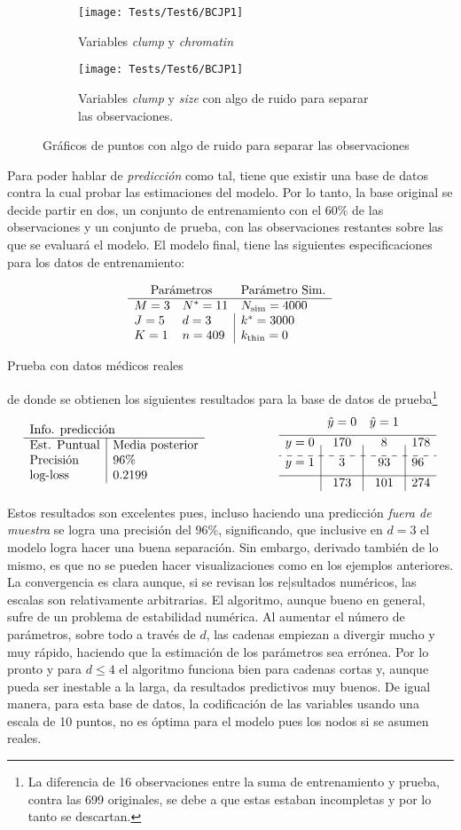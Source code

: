 \documentclass[../Main/Main.tex]{subfiles}
\begin{document}
\begin{figure}[h]
        \centering
        \begin{subfigure}[b]{0.45\textwidth}
            \centering
            \texttt{[image: Tests/Test6/BCJP1]}
            \caption{Variables \textit{clump} y \textit{chromatin}}
			\label{fig:BCJP1}
        \end{subfigure}
        \hfill
        \begin{subfigure}[b]{0.45\textwidth}  
            \centering 
            \texttt{[image: Tests/Test6/BCJP1]}
            \caption{Variables \textit{clump} y \textit{size} con algo de ruido para separar las observaciones.}
			\label{fig:BCJP2}
        \end{subfigure}
		\caption{Gráficos de puntos con algo de ruido para separar las observaciones}
		\label{fig:BCJP}
\end{figure}
Para poder hablar de \textit{predicción} como tal, tiene que existir una base de datos contra la cual probar las estimaciones del modelo. Por lo tanto, la base original se decide partir en dos, un conjunto de entrenamiento con el $60\%$ de las observaciones y un conjunto de prueba, con las observaciones restantes sobre las que se evaluará el modelo. El modelo final, tiene las siguientes especificaciones para los datos de entrenamiento:
\begin{table}[H]
$$\paramsmod{3}{5}{1}{11}{3}{409}{4000}{3000}{0}$$
\caption*{Prueba con datos médicos reales}
\label{ej:BC}
\end{table}
de donde se obtienen los siguientes resultados para la base de datos de prueba\footnote{La diferencia de 16 observaciones entre la suma de entrenamiento y prueba, contra las 699 originales, se debe a que estas estaban incompletas y por lo tanto se descartan.}
\begin{align*}
\resultados{\text{Media posterior}}{96}{0.2199}
\qquad\qquad\qquad
\matconf{170}{8}{178}{3}{93}{96}{173}{101}{274}
\end{align*}

Estos resultados son excelentes pues, incluso haciendo una predicción \textit{fuera de muestra} se logra una precisión del $96\%$, significando, que inclusive en $d=3$ el modelo logra hacer una buena separación. Sin embargo, derivado también de lo mismo, es que no se pueden hacer visualizaciones como en los ejemplos anteriores. La convergencia es clara aunque, si se revisan los re|sultados numéricos, las escalas son relativamente arbitrarias. El algoritmo, aunque bueno en general, sufre de un problema de estabilidad numérica. Al aumentar el número de parámetros, sobre todo a través de $d$, las cadenas empiezan a divergir mucho y muy rápido, haciendo que la estimación de los parámetros sea errónea. Por lo pronto y para $d\leq4$ el algoritmo funciona bien para cadenas cortas y, aunque pueda ser inestable a la larga, da resultados predictivos muy buenos. De igual manera, para esta base de datos, la codificación de las variables usando una escala de 10 puntos, no es óptima para el modelo pues los nodos si se asumen reales. 
\end{document}
